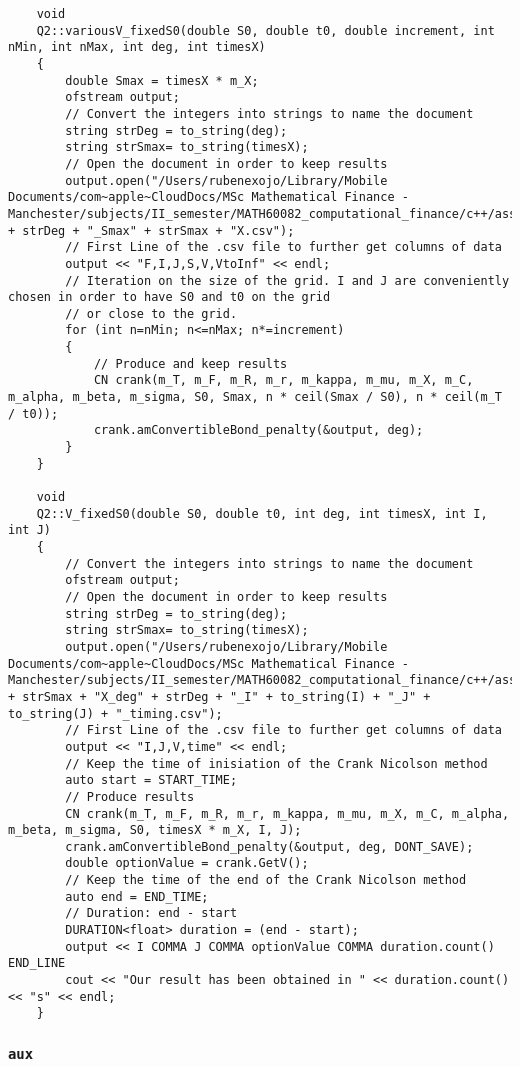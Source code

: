 \begin{lstlisting}
	void
	Q2::variousV_fixedS0(double S0, double t0, double increment, int nMin, int nMax, int deg, int timesX)
	{
		double Smax = timesX * m_X;
		ofstream output;
		// Convert the integers into strings to name the document
		string strDeg = to_string(deg);
		string strSmax= to_string(timesX);
		// Open the document in order to keep results
		output.open("/Users/rubenexojo/Library/Mobile Documents/com~apple~CloudDocs/MSc Mathematical Finance - Manchester/subjects/II_semester/MATH60082_computational_finance/c++/assignment2/data/task2/amConvBondValues_increasing_iMax_and_jMax_deg" + strDeg + "_Smax" + strSmax + "X.csv");
		// First Line of the .csv file to further get columns of data
		output << "F,I,J,S,V,VtoInf" << endl;
		// Iteration on the size of the grid. I and J are conveniently chosen in order to have S0 and t0 on the grid
		// or close to the grid.
		for (int n=nMin; n<=nMax; n*=increment)
		{
			// Produce and keep results
			CN crank(m_T, m_F, m_R, m_r, m_kappa, m_mu, m_X, m_C, m_alpha, m_beta, m_sigma, S0, Smax, n * ceil(Smax / S0), n * ceil(m_T / t0));
			crank.amConvertibleBond_penalty(&output, deg);
		}
	}
	
	void
	Q2::V_fixedS0(double S0, double t0, int deg, int timesX, int I, int J)
	{
		// Convert the integers into strings to name the document
		ofstream output;
		// Open the document in order to keep results
		string strDeg = to_string(deg);
		string strSmax= to_string(timesX);
		output.open("/Users/rubenexojo/Library/Mobile Documents/com~apple~CloudDocs/MSc Mathematical Finance - Manchester/subjects/II_semester/MATH60082_computational_finance/c++/assignment2/data/task2/amConvBondValue_" + strSmax + "X_deg" + strDeg + "_I" + to_string(I) + "_J" + to_string(J) + "_timing.csv");
		// First Line of the .csv file to further get columns of data
		output << "I,J,V,time" << endl;
		// Keep the time of inisiation of the Crank Nicolson method
		auto start = START_TIME;
		// Produce results
		CN crank(m_T, m_F, m_R, m_r, m_kappa, m_mu, m_X, m_C, m_alpha, m_beta, m_sigma, S0, timesX * m_X, I, J);
		crank.amConvertibleBond_penalty(&output, deg, DONT_SAVE);
		double optionValue = crank.GetV();
		// Keep the time of the end of the Crank Nicolson method
		auto end = END_TIME;
		// Duration: end - start
		DURATION<float> duration = (end - start);
		output << I COMMA J COMMA optionValue COMMA duration.count() END_LINE
		cout << "Our result has been obtained in " << duration.count() << "s" << endl;
	}
\end{lstlisting}
\subsubsection{\texttt{aux}}

